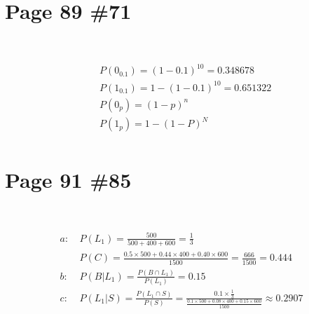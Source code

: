 \documentclass{article}
\begin{document}
\newpage

\section*{Page 89 \#71}

~

\begin{align*}
    &P(0_{0.1})=(1-0.1)^{10}=0.348678\\
    &P(1_{0.1})=1-(1-0.1)^{10}=0.651322\\
    &P(0_{p})=(1-p)^n\\
    &P(1_{p})=1-(1-P)^N\\
\end{align*}

\newpage

\section*{Page 91 \#85}

~

\begin{align*}
    a:\ &P(L_1)=\frac{500}{500+400+600}=\frac{1}{3}\\
    &P(C)=\frac{0.5\times500+0.44\times 400+0.40\times 600}{1500}=\frac{666}{1500}=0.444\\
    b:\ &P(B|L_1)=\frac{P(B\cap L_1)}{P(L_1)}=0.15\\
    c:\ &P(L_1|S)=\frac{P(L_1\cap S)}{P(S)}=\frac{0.1\times \frac{1}{3}}{\frac{0.1\times 500+0.08\times 400+0.15\times 600}{1500}}\approx0.2907\\
\end{align*}
\end{document}
